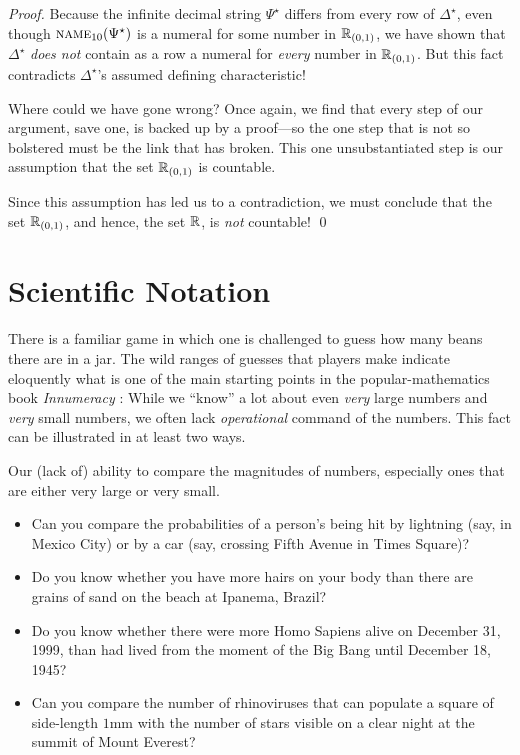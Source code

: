 \begin{proof}
\smallskip

Because the infinite decimal string $\Psi^\star$ differs from every row of $\Delta^\star$, even though $\mbox{\sc name}_{10}(\Psi^\star)$ is a numeral for some number in $\mathbb{R}_{(0,1)}$, we
have shown that $\Delta^\star$ {\em does not} contain as a row a numeral for {\em every} number in $\mathbb{R}_{(0,1)}$.  But this fact contradicts $\Delta^\star$'s assumed defining characteristic!

\medskip

Where could we have gone wrong?  Once again, we find that every step of our argument, save one, is backed up by a proof---so the one step that is not so bolstered must be the link that has broken.  This one unsubstantiated step is our assumption that the set $\mathbb{R}_{(0,1)}$ is countable.  

\medskip

Since this assumption has led us to a contradiction, we must conclude that the set $\mathbb{R}_{(0,1)}$, and hence, the set $\mathbb{R}$, is {\em not} countable!  \qed
\end{proof}



\section{Scientific Notation}
\label{sec:scientific-notation}

There is a familiar game in which one is challenged to guess how many beans there are in a jar.  The wild ranges of guesses that players make indicate eloquently what is one of the main starting points in the popular-mathematics book {\it Innumeracy} \cite{Paulos}: While we ``know''
a lot about even {\em very} large numbers and {\em very} small numbers, we often lack {\em operational} command of the numbers.  This fact can be illustrated in at least two ways.

\bigskip

Our (lack of) ability to compare the magnitudes of numbers, especially ones that are either very large or very small.
\begin{itemize}
\item
Can you compare the probabilities of a person's being hit by lightning (say, in Mexico City) or by a car (say, crossing Fifth Avenue in Times Square)?
\medskip\item
Do you know whether you have more hairs on your body than there are grains of sand on the beach at Ipanema, Brazil?
\medskip\item
Do you know whether there were more Homo Sapiens alive on December 31, 1999, than had lived from the moment of the Big Bang until December 18, 1945?
\medskip\item
Can you compare the number of rhinoviruses that can populate a square of side-length $1$mm with the number of stars visible on a clear night at the summit of Mount Everest?
\end{itemize}

